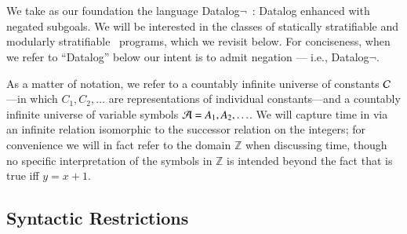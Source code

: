 \section{\large \bf \slang}
\label{sec:slang}

We take as our foundation the language Datalog$\lnot$~\cite{ullmanbook}: Datalog enhanced with negated subgoals.  We will be interested in the
classes of statically stratifiable 
and modularly stratifiable~\cite{modular} programs, which we revisit below.  For conciseness, when we refer to ``Datalog'' below our intent is to admit negation --- i.e., Datalog$\lnot$.  


As a matter of notation, we refer to a countably infinite universe of constants
$\mathcal{C}$---in which $C_{1}, C_{2}, \ldots$ are representations of individual
constants---and a countably infinite universe of variable symbols $\mathcal{A} = A_1,
A_2, \ldots$.
We will capture time in \slang via an infinite relation  isomorphic to the successor relation on the integers; for convenience we will in fact refer to the domain $\mathbb{Z}$ when discussing time, though no specific interpretation of the symbols in $\mathbb{Z}$ is intended beyond the fact that  is true iff $y = x + 1$.


\subsection{Syntactic Restrictions}
\label{sec:syntaxrestrictions}

